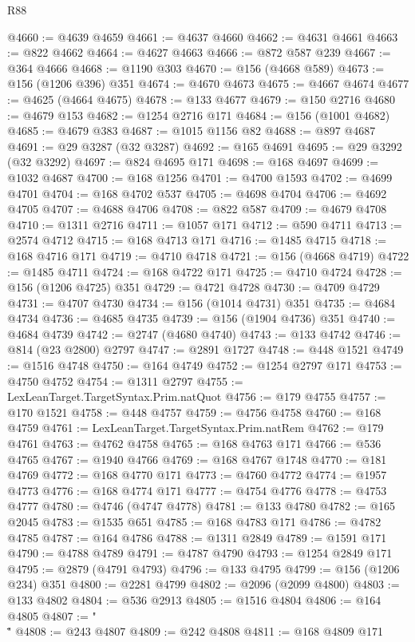 \begin{lexlean}{R88}
\begin{coremodule}
@4660 := @4639 @4659
@4661 := @4637 @4660
@4662 := @4631 @4661
@4663 := @822 @4662
@4664 := @4627 @4663
@4666 := @872 @587 @239
@4667 := @364 @4666
@4668 := @1190 @303
@4670 := @156 (@4668 @589)
@4673 := @156 (@1206 @396) @351
@4674 := @4670 @4673
@4675 := @4667 @4674
@4677 := @4625 (@4664 @4675)
@4678 := @133 @4677
@4679 := @150 @2716
@4680 := @4679 @153
@4682 := @1254 @2716 @171
@4684 := @156 (@1001 @4682)
@4685 := @4679 @383
@4687 := @1015 @1156 @82
@4688 := @897 @4687
@4691 := @29 @3287 (@32 @3287)
@4692 := @165 @4691
@4695 := @29 @3292 (@32 @3292)
@4697 := @824 @4695 @171
@4698 := @168 @4697
@4699 := @1032 @4687
@4700 := @168 @1256
@4701 := @4700 @1593
@4702 := @4699 @4701
@4704 := @168 @4702 @537
@4705 := @4698 @4704
@4706 := @4692 @4705
@4707 := @4688 @4706
@4708 := @822 @587
@4709 := @4679 @4708
@4710 := @1311 @2716
@4711 := @1057 @171
@4712 := @590 @4711
@4713 := @2574 @4712
@4715 := @168 @4713 @171
@4716 := @1485 @4715
@4718 := @168 @4716 @171
@4719 := @4710 @4718
@4721 := @156 (@4668 @4719)
@4722 := @1485 @4711
@4724 := @168 @4722 @171
@4725 := @4710 @4724
@4728 := @156 (@1206 @4725) @351
@4729 := @4721 @4728
@4730 := @4709 @4729
@4731 := @4707 @4730
@4734 := @156 (@1014 @4731) @351
@4735 := @4684 @4734
@4736 := @4685 @4735
@4739 := @156 (@1904 @4736) @351
@4740 := @4684 @4739
@4742 := @2747 (@4680 @4740)
@4743 := @133 @4742
@4746 := @814 (@23 @2800) @2797
@4747 := @2891 @1727
@4748 := @448 @1521
@4749 := @1516 @4748
@4750 := @164 @4749
@4752 := @1254 @2797 @171
@4753 := @4750 @4752
@4754 := @1311 @2797
@4755 := LexLeanTarget.TargetSyntax.Prim.natQuot
@4756 := @179 @4755
@4757 := @170 @1521
@4758 := @448 @4757
@4759 := @4756 @4758
@4760 := @168 @4759
@4761 := LexLeanTarget.TargetSyntax.Prim.natRem
@4762 := @179 @4761
@4763 := @4762 @4758
@4765 := @168 @4763 @171
@4766 := @536 @4765
@4767 := @1940 @4766
@4769 := @168 @4767 @1748
@4770 := @181 @4769
@4772 := @168 @4770 @171
@4773 := @4760 @4772
@4774 := @1957 @4773
@4776 := @168 @4774 @171
@4777 := @4754 @4776
@4778 := @4753 @4777
@4780 := @4746 (@4747 @4778)
@4781 := @133 @4780
@4782 := @165 @2045
@4783 := @1535 @651
@4785 := @168 @4783 @171
@4786 := @4782 @4785
@4787 := @164 @4786
@4788 := @1311 @2849
@4789 := @1591 @171
@4790 := @4788 @4789
@4791 := @4787 @4790
@4793 := @1254 @2849 @171
@4795 := @2879 (@4791 @4793)
@4796 := @133 @4795
@4799 := @156 (@1206 @234) @351
@4800 := @2281 @4799
@4802 := @2096 (@2099 @4800)
@4803 := @133 @4802
@4804 := @536 @2913
@4805 := @1516 @4804
@4806 := @164 @4805
@4807 := "\\\""
@4808 := @243 @4807
@4809 := @242 @4808
@4811 := @168 @4809 @171

\end{coremodule}
\end{lexlean}
